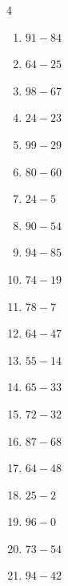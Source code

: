 \begin{multicols}{4}
\begin{enumerate}
  \item $91-84$
        \phantom{$=7$}

  \item $64-25$
        \phantom{$=39$}

  \item $98-67$
        \phantom{$=31$}

  \item $24-23$
        \phantom{$=1$}

  \item $99-29$
        \phantom{$=70$}

  \item $80-60$
        \phantom{$=20$}

  \item $24-5$
        \phantom{$=19$}

  \item $90-54$
        \phantom{$=36$}

  \item $94-85$
        \phantom{$=9$}

  \item $74-19$
        \phantom{$=55$}

  \item $78-7$
        \phantom{$=71$}

  \item $64-47$
        \phantom{$=17$}

  \item $55-14$
        \phantom{$=41$}

\columnbreak %

\resetques

  \item $65-33$
        \phantom{$=32$}

  \item $72-32$
        \phantom{$=40$}

  \item $87-68$
        \phantom{$=19$}

  \item $64-48$
        \phantom{$=16$}

  \item $25-2$
        \phantom{$=23$}

  \item $96-0$
        \phantom{$=96$}

  \item $73-54$
        \phantom{$=19$}

  \item $94-42$
        \phantom{$=52$}


\end{enumerate}
\end{multicols}
